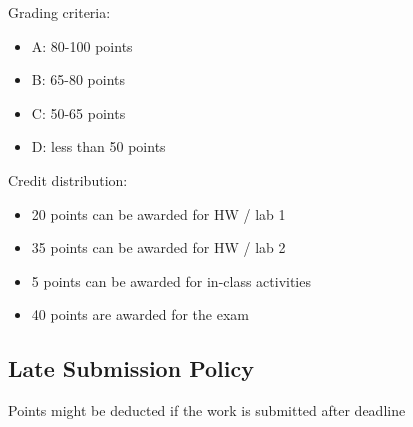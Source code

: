 Grading criteria:
\begin{itemize}
    \item A: 80-100 points
    \item B: 65-80 points
    \item C: 50-65 points
    \item D: less than 50 points
\end{itemize}

Credit distribution:
\begin{itemize}
    \item 20 points can be awarded for HW / lab 1
    \item 35 points can be awarded for HW / lab 2
    \item 5 points can be awarded for in-class activities
    \item 40 points are awarded for the exam
\end{itemize}

\subsection{Late Submission Policy}
Points might be deducted if the work is submitted after deadline
